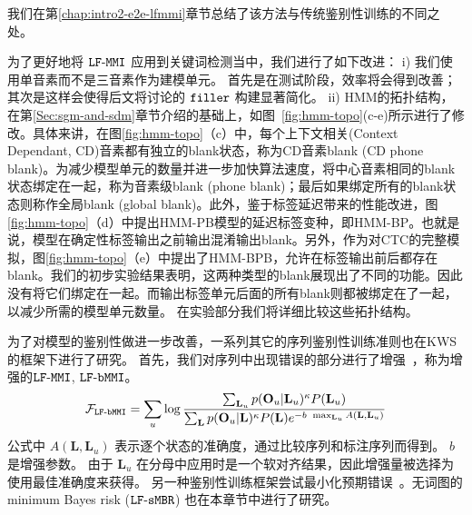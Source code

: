 我们在第\ref{chap:intro2-e2e-lfmmi}章节总结了该方法与传统鉴别性训练的不同之处。



为了更好地将 $\tt{LF\text{-}MMI}$ 应用到关键词检测当中，我们进行了如下改进：
i) 我们使用单音素而不是三音素作为建模单元。
首先是在测试阶段，效率将会得到改善；其次是这样会使得后文将讨论的 $\tt filler$ 构建显著简化。
ii) HMM的拓扑结构，在第\ref{Sec:sgm-and-sdm}章节介绍的基础上，如图~\ref{fig:hmm-topo}(c-e)所示进行了修改。具体来讲，在图\ref{fig:hmm-topo}（c）中，每个上下文相关(Context Dependant, CD)音素都有独立的blank状态，称为CD音素blank (CD phone blank)。为减少模型单元的数量并进一步加快算法速度，将中心音素相同的blank状态绑定在一起，称为音素级blank (phone blank)；最后如果绑定所有的blank状态则称作全局blank (global blank)。此外，鉴于标签延迟带来的性能改进\cite{amodei2015deep}，图\ref{fig:hmm-topo}（d）中提出HMM-PB模型的延迟标签变种，即HMM-BP。也就是说，模型在确定性标签输出之前输出混淆输出blank。另外，作为对CTC的完整模拟，图\ref{fig:hmm-topo}（e）中提出了HMM-BPB，允许在标签输出前后都存在blank。我们的初步实验结果表明，这两种类型的blank展现出了不同的功能。因此没有将它们绑定在一起。而输出标签单元后面的所有blank则都被绑定在了一起，以减少所需的模型单元数量。
在实验部分我们将详细比较这些拓扑结构。

为了对模型的鉴别性做进一步改善，一系列其它的序列鉴别性训练准则也在KWS的框架下进行了研究。 
首先，我们对序列中出现错误的部分进行了增强~\cite{povey2008boosted}，称为增强的$\tt{ LF\text{-}MMI}$, $\tt{ LF\text{-}bMMI}$。
\begin{equation}
\label{equ:kws-bmmi}
\begin{split}
\mathcal{F}_{\tt{LF\text{-}bMMI}}
=\sum_{u} \log \frac {\sum_{\mathbf{L}_u} p(\mathbf{O}_u|\mathbf{L}_u)^{\kappa}P(\mathbf{L}_u)}{\sum_{\mathbf{L}} p(\mathbf{O}_u|\mathbf{L})^{\kappa}P(\mathbf{L})e^{-b\ \mathop{\max}_{\mathbf{L}_u} A(\mathbf{L},\mathbf{L}_u)}}  
\end{split}
\end{equation}
公式中 $A(\mathbf{L},\mathbf{L}_u)$ 表示逐个状态的准确度，通过比较序列和标注序列而得到。
$b$ 是增强参数。
由于 $\mathbf{L}_u$ 在分母中应用时是一个软对齐结果，因此增强量被选择为使用最佳准确度来获得。
另一种鉴别性训练框架尝试最小化预期错误~\cite{gibson2006hypothesis}。无词图的minimum
Bayes risk ($\tt{LF\text{-}sMBR}$) 也在本章节中进行了研究。

